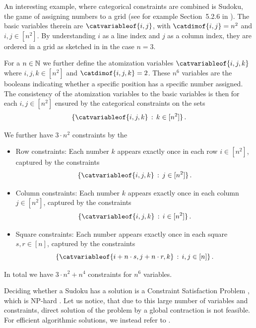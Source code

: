 \begin{example}[Sudoku]
    \label{exa:sudoku}
    An interesting example, where categorical constraints are combined is Sudoku, the game of assigning numbers to a grid (see for example Section~5.2.6 in \cite{russell_artificial_2021}).
    The basic variables therein are $\catvariableof{i,j}$, with $\catdimof{i,j}=n^2$ and $i,j\in[n^2]$.
    By understanding $i$ as a line index and $j$ as a column index, they are ordered in a grid as sketched in  in the case $n=3$.

    For a $n\in\mathbb{N}$ we further define the atomization variables $\catvariableof{i,j,k}$ where $i,j,k\in[n^2]$ and $\catdimof{i,j,k}=2$.
    These $n^6$ variables are the booleans indicating whether a specific position has a specific number assigned.
    The consistency of the atomization variables to the basic variables is then for each $i,j\in[n^2]$ ensured by the categorical constraints on the sets
    \[ \{\catvariableof{i,j,k} \wcols k\in [n^2] \} \, . \]

    We further have $3\cdot n^2$ constraints by the
    \begin{itemize}
        \item Row constraints: Each number $k$ appears exactly once in each row $i\in[n^2]$, captured by the constraints
        \[ \{\catvariableof{i,j,k}  \wcols j \in [n^2] \} \, . \]
        \item Column constraints: Each number $k$ appears exactly once in each column $j\in[n^2]$, captured by the constraints
        \[ \{\catvariableof{i,j,k}  \wcols i \in [n^2] \} \, . \]
        \item Square constraints: Each number appears exactly once in each square $s,r\in[n]$, captured by the constraints
        \[ \{\catvariableof{i+n\cdot s,j+n\cdot r,k}  \wcols i,j \in [n] \} \, . \]
    \end{itemize}

    In total we have $3\cdot n^2 + n^4$ constraints for $n^6$ variables.

    Deciding whether a Sudoku has a solution is a Constraint Satisfaction Problem \cite{simonis_sudoku_2005}, which is NP-hard \cite{agerbeck_multi-agent_2008}.
    Let us notice, that due to this large number of variables and constraints, direct solution of the problem by a global contraction is not feasible.
    For efficient algorithmic solutions, we instead refer to .


\end{example}
